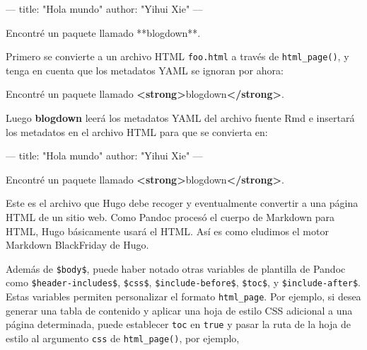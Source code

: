 \documentclass[12pt,]{krantz}
\makeatletter
\newenvironment{Shaded}{\begin{snugshade}}{\end{snugshade}}
\newcommand{\KeywordTok}[1]{\textcolor[rgb]{0.13,0.29,0.53}{\textbf{#1}}}
\newcommand{\NormalTok}[1]{#1}
\newenvironment{kframe}{%
\medskip{}
\setlength{\fboxsep}{.8em}
 \def\at@end@of@kframe{}%
 \ifinner\ifhmode%
  \def\at@end@of@kframe{\end{minipage}}%
  \begin{minipage}{\columnwidth}%
 \fi\fi%
 \def\FrameCommand##1{\hskip\@totalleftmargin \hskip-\fboxsep
 \colorbox{shadecolor}{##1}\hskip-\fboxsep
     \hskip-\linewidth \hskip-\@totalleftmargin \hskip\columnwidth}%
 \MakeFramed {\advance\hsize-\width
   \@totalleftmargin\z@ \linewidth\hsize
   \@setminipage}}%
 {\par\unskip\endMakeFramed%
 \at@end@of@kframe}
\renewenvironment{Shaded}{\begin{kframe}}{\end{kframe}}
\theoremstyle{definition}
\theoremstyle{definition}
\theoremstyle{definition}
\theoremstyle{remark}
\makeatother
\begin{document}
\begin{Shaded}
\begin{Highlighting}[]
\NormalTok{---}
\NormalTok{title: "Hola mundo"}
\NormalTok{author: "Yihui Xie"}
\NormalTok{---}

\NormalTok{Encontré un paquete llamado **blogdown**.}
\end{Highlighting}
\end{Shaded}

Primero se convierte a un archivo HTML \texttt{foo.html} a través de
\texttt{html\_page()}, y tenga en cuenta que los metadatos YAML se
ignoran por ahora:

\begin{Shaded}
\begin{Highlighting}[]
\NormalTok{Encontré un paquete llamado }\KeywordTok{<strong>}\NormalTok{blogdown}\KeywordTok{</strong>}\NormalTok{.}
\end{Highlighting}
\end{Shaded}

Luego \textbf{blogdown} leerá los metadatos YAML del archivo fuente Rmd
e insertará los metadatos en el archivo HTML para que se convierta en:

\begin{Shaded}
\begin{Highlighting}[]
\NormalTok{---}
\NormalTok{title: "Hola mundo"}
\NormalTok{author: "Yihui Xie"}
\NormalTok{---}

\NormalTok{Encontré un paquete llamado }\KeywordTok{<strong>}\NormalTok{blogdown}\KeywordTok{</strong>}\NormalTok{.}
\end{Highlighting}
\end{Shaded}

Este es el archivo que Hugo debe recoger y eventualmente convertir a una
página HTML de un sitio web. Como Pandoc procesó el cuerpo de Markdown
para HTML, Hugo básicamente usará el HTML. Así es como eludimos el motor
Markdown BlackFriday de Hugo.

Además de \texttt{\$body\$}, puede haber notado otras variables de
plantilla de Pandoc como \texttt{\$header-includes\$}, \texttt{\$css\$},
\texttt{\$include-before\$}, \texttt{\$toc\$}, y
\texttt{\$include-after\$}. Estas variables permiten personalizar el
formato \texttt{html\_page}. Por ejemplo, si desea generar una tabla de
contenido y aplicar una hoja de estilo CSS adicional a una página
determinada, puede establecer \texttt{toc} en \texttt{true} y pasar la
ruta de la hoja de estilo al argumento \texttt{css} de
\texttt{html\_page()}, por ejemplo,
\end{document}
